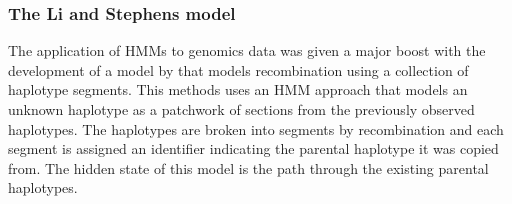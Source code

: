 

\subsubsection{The Li and Stephens model}
The application of HMMs to genomics data was given a major boost with the development of a model by \citet{Li2003} that models recombination using a collection of haplotype segments.
This methods uses an HMM approach that models an unknown haplotype as a patchwork of sections from the previously observed haplotypes.
The haplotypes are broken into segments by recombination and each segment is assigned an identifier indicating the parental haplotype it was copied from.
The hidden state of this model is the path through the existing parental haplotypes.

